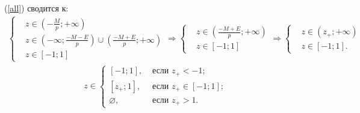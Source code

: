 \documentclass[a4paper,12pt,landscape]{article}
\begin{document}
(\ref{all}) сводится к:
\begin{align*}
\left\lbrace
\begin{aligned}
&z\in\left(-\frac{M}{p};+\infty\right)\\
&z\in\left(-\infty;\frac{-M-E}{p}\right)\cup\left(\frac{-M+E}{p};+\infty\right)\\
&z\in[-1;1]
\end{aligned}\right.\Rightarrow
\left\lbrace
\begin{aligned}
&z\in\left(\frac{-M+E}{p};+\infty\right)\\
&z\in[-1;1]
\end{aligned}\right.\Rightarrow
\left\lbrace
\begin{aligned}
&z\in(z_{+};+\infty)\\
&z\in[-1;1].
\end{aligned}\right.
\end{align*}
%
\begin{align}
\boxed{z\in
\begin{cases}
[-1;1],&\text{ если }z_{+}<-1;\\
[z_{+};1],&\text{ если }z_{+}\in[-1;1];\\
\varnothing,&\text{ если }z_{+}>1.
\end{cases}}
\label{zcases}
\end{align}
%
\end{document}

